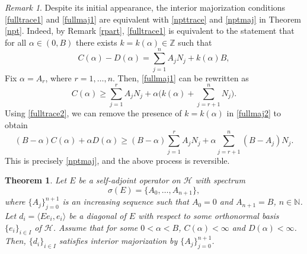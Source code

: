 \documentclass[12pt]{amsart}
\newcounter{Theorem}
\numberwithin{equation}{section}
\numberwithin{Theorem}{section}
\theoremstyle{plain}
\newtheorem{thm}[Theorem]{Theorem}
\theoremstyle{definition}
\theoremstyle{remark}
\newtheorem{remark}{Remark}[section]
\begin{document}
\begin{remark}
Despite its initial appearance, the interior majorization conditions \eqref{fulltrace1} and \eqref{fullmaj1} are equivalent with  \eqref{npttrace} and \eqref{nptmaj} in Theorem \ref{npt}. Indeed, by Remark \ref{rpart}, \eqref{fulltrace1} is equivalent to the statement that for all $\alpha \in (0,B)$ there exists $k=k(\alpha) \in {\mathbb{Z}}$ such that
\begin{equation}
\label{fulltrace2} 
C(\alpha) -D(\alpha) =  \sum_{j=1}^{n} A_j N_j +k(\alpha) B,
\end{equation}
Fix $\alpha = A_r$, where $r=1, \ldots, n$. Then, \eqref{fullmaj1} can be rewritten as 
\begin{equation}
\label{fullmaj2} 
C(\alpha) \ge\sum_{j =1}^{r} A_j N_j + \alpha \bigg( k(\alpha)+\sum_{j=r+1}^{n} N_j  \bigg).
\end{equation}
Using \eqref{fulltrace2}, we can remove the presence of $k=k(\alpha)$ in \eqref{fullmaj2} to obtain
\begin{equation}
\label{fullmaj3} 
(B-\alpha)C(\alpha) +\alpha D(\alpha)  \ge
(B-\alpha)\sum_{j = 1}^{r} A_j N_j + \alpha \sum_{j=r+1}^{n} (B-A_j)N_j.
\end{equation}
This is precisely \eqref{nptmaj}, and the above process is reversible. 
\end{remark}

\begin{thm}\label{int-nec} Let $E$ be a self-adjoint operator on $\mathcal H$ with spectrum 
\[
\sigma(E)=\{A_0,\ldots,A_{n+1}\},
\]
where $\{A_j\}_{j=0}^{n+1}$ is an increasing sequence such that $A_0=0$ and $A_{n+1}=B$, $n\in {\mathbb{N}}$. Let $d_{i}=\langle Ee_{i},e_{i}\rangle$ be a diagonal of $E$ with respect to some orthonormal basis $\{e_{i}\}_{i\in I}$ of ${\mathcal{H}}$. 
Assume that for some $0< \alpha<B$, 
$C(\alpha)<\infty$ and $D(\alpha)<\infty$.
Then,
$\{d_i\}_{i\in I}$ satisfies interior majorization by $\{A_j\}_{j=0}^{n+1}$.
\end{thm}
\end{document}
